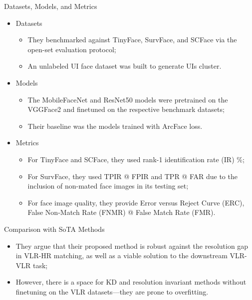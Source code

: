 \documentclass[aspectratio=169,xcolor=dvipsnames]{beamer}
\begin{document}
\begin{frame}{Datasets, Models, and Metrics}
    \begin{itemize}
        \item Datasets
        \begin{itemize}
            \item They benchmarked against TinyFace, SurvFace, and SCFace via the open-set evaluation protocol;
            \item An unlabeled UI face dataset was built to generate UIs cluster.
        \end{itemize}
        \item Models
        \begin{itemize}
            \item The MobileFaceNet and ResNet50 models were pretrained on the VGGFace2 and finetuned on the respective benchmark datasets;
            \item Their baseline was the models trained with ArcFace loss.
        \end{itemize}
        \item Metrics
        \begin{itemize}
            \item For TinyFace and SCFace, they used rank-1 identification rate (IR) \%;
            \item For SurvFace, they used TPIR @ FPIR and TPR @ FAR due to the inclusion of non-mated face images in its testing set; 
            \item For face image quality, they provide Error versus Reject Curve (ERC), False Non-Match Rate (FNMR) @ False Match Rate (FMR).
        \end{itemize}
    \end{itemize}
\end{frame}


\begin{frame}{Comparison with SoTA Methods}
    \begin{itemize}
        \item They argue that their proposed method is robust against the resolution gap in VLR-HR matching, as well as a viable solution to the downstream VLR-VLR task;
        \item However, there is a space for KD and resolution invariant methods without finetuning on the VLR datasets---they are prone to overfitting.
    \end{itemize}
\end{frame}
\end{document}
